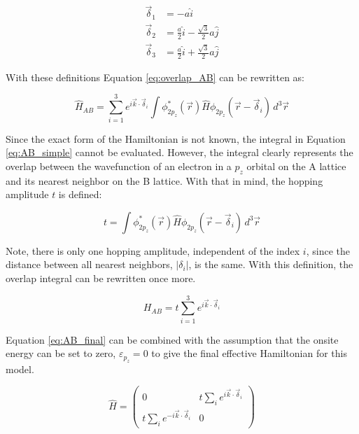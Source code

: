 \begin{align}
    \vec{\delta}_1 &= -a\hat{i} \nonumber \\
    \vec{\delta}_2 &= \frac{a}{2}\hat{i} - \frac{\sqrt{3}}{2}a\hat{j} \label{eq:deltas} \\
    \vec{\delta}_3 &= \frac{a}{2}\hat{i} + \frac{\sqrt{3}}{2}a\hat{j} \nonumber 
\label{eq:deltas}
\end{align}

With these definitions Equation \ref{eq:overlap_AB} can be rewritten as:

\begin{equation}
\label{eq:AB_simple}
    \hat{H}_{AB} = \sum_{i=1}^{3} e^{i\vec{k}\cdot\vec{\delta}_i} \int \phi^*_{2p_z}(\vec{r}) \hat{H} \phi_{2p_z}(\vec{r}- \vec{\delta}_i) \, d^3\vec{r}
\end{equation}

Since the exact form of the Hamiltonian is not known, the integral in Equation \ref{eq:AB_simple} cannot be evaluated. However, the integral clearly represents the overlap between the wavefunction of an electron in a $p_z$ orbital on the A lattice and its nearest neighbor on the B lattice. With that in mind, the hopping amplitude $t$ is defined:

\begin{equation}
\label{eq:hopping_amp}
    t = \int \phi^*_{2p_z}(\vec{r}) \hat{H} \phi_{2p_z}(\vec{r}-\vec{\delta}_i) \, d^3\vec{r}
\end{equation}

Note, there is only one hopping amplitude, independent of the index $i$, since the distance between all nearest neighbors, $\lvert \delta_i \rvert$, is the same. With this definition, the overlap integral can be rewritten once more.

\begin{equation}
\label{eq:AB_final}
    H_{AB} = t \sum_{i=1}^{3} e^{i\vec{k}\cdot\vec{\delta}_i}
\end{equation}

Equation \ref{eq:AB_final} can be combined with the assumption that the onsite energy can be set to zero, $\varepsilon_{p_z} = 0$ to give the final effective Hamiltonian for this model.

\begin{equation}
\label{eq:effective_H}
    \hat{H} = \begin{pmatrix} 0 & t \sum_{i}^{} e^{i\vec{k}\cdot\vec{\delta}_i} \\  t \sum_{i}^{} e^{-i\vec{k}\cdot\vec{\delta}_i} & 0 \end{pmatrix}
\end{equation}

